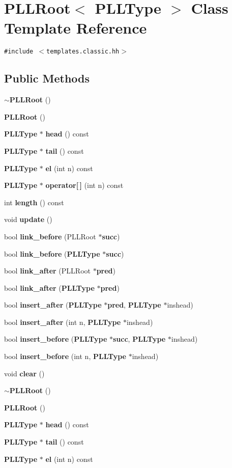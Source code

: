 \section{PLLRoot$<$ PLLType $>$  Class Template Reference}
\label{classPLLRoot}
{\tt \#include $<$templates.classic.hh$>$}

\subsection*{Public Methods}
\begin{CompactItemize}
\item 
{\bf $\sim$PLLRoot} ()
\item 
{\bf PLLRoot} ()
\item 
{\bf PLLType} $\ast$ {\bf head} () const
\item 
{\bf PLLType} $\ast$ {\bf tail} () const
\item 
{\bf PLLType} $\ast$ {\bf el} (int n) const
\item 
{\bf PLLType} $\ast$ {\bf operator[$\,$]} (int n) const
\item 
int {\bf length} () const
\item 
void {\bf update} ()
\item 
bool {\bf link\_\-before} (PLLRoot $\ast${\bf succ})
\item 
bool {\bf link\_\-before} ({\bf PLLType} $\ast${\bf succ})
\item 
bool {\bf link\_\-after} (PLLRoot $\ast${\bf pred})
\item 
bool {\bf link\_\-after} ({\bf PLLType} $\ast${\bf pred})
\item 
bool {\bf insert\_\-after} ({\bf PLLType} $\ast${\bf pred}, {\bf PLLType} $\ast$inshead)
\item 
bool {\bf insert\_\-after} (int n, {\bf PLLType} $\ast$inshead)
\item 
bool {\bf insert\_\-before} ({\bf PLLType} $\ast${\bf succ}, {\bf PLLType} $\ast$inshead)
\item 
bool {\bf insert\_\-before} (int n, {\bf PLLType} $\ast$inshead)
\item 
void {\bf clear} ()
\item 
{\bf $\sim$PLLRoot} ()
\item 
{\bf PLLRoot} ()
\item 
{\bf PLLType} $\ast$ {\bf head} () const
\item 
{\bf PLLType} $\ast$ {\bf tail} () const
\item 
{\bf PLLType} $\ast$ {\bf el} (int n) const

\end{CompactItemize}
